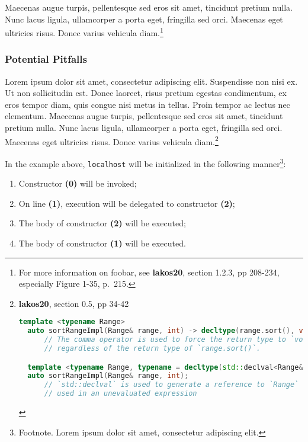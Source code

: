 \documentclass[twoside,10pt,letterpaper,usenames]{newstyle-PearsonGeneric-7-38}
\newcommand{\passthrough}[1]{\lstset{mathescape=false}#1\lstset{mathescape=true}}
\begin{document}
Maecenas augue turpis, pellentesque sed eros sit amet, tincidunt pretium
nulla. Nunc lacus ligula, ullamcorper a porta eget, fringilla sed orci.
Maecenas eget ultricies risus. Donec varius vehicula diam.\footnote{For
  more information on foobar, see \textbf{lakos20}, section 1.2.3, pp
  208-234, especially Figure 1-35, p.~215.}

\hypertarget{potential-pitfalls}{%
\subsubsection{Potential Pitfalls}\label{potential-pitfalls}}

Lorem ipsum dolor sit amet, consectetur adipiscing elit. Suspendisse non
nisi ex. Ut non sollicitudin est. Donec laoreet, risus pretium egestas
condimentum, ex eros tempor diam, quis congue nisi metus in tellus.
Proin tempor ac lectus nec elementum. Maecenas augue turpis,
pellentesque sed eros sit amet, tincidunt pretium nulla. Nunc lacus
ligula, ullamcorper a porta eget, fringilla sed orci. Maecenas eget
ultricies risus. Donec varius vehicula diam.\footnote{\textbf{lakos20},
  section 0.5, pp 34-42

  \begin{lstlisting}[language=C++, label={ testlabel }, basicstyle=\footnotesize]
  template <typename Range>
  auto sortRangeImpl(Range& range, int) -> decltype(range.sort(), void());
      // The comma operator is used to force the return type to `void`,
      // regardless of the return type of `range.sort()`.

  template <typename Range, typename = decltype(std::declval<Range&>().sort()>
  auto sortRangeImpl(Range& range, int);
      // `std::declval` is used to generate a reference to `Range` that can be
      // used in an unevaluated expression
  \end{lstlisting}
      }

In the example above, \passthrough{\lstinline!localhost!} will be
initialized in the following manner\footnote{Footnote. Lorem ipsum dolor
  sit amet, consectetur adipiscing elit.}:

\begin{enumerate}
\def\labelenumi{\arabic{enumi}.}
\item
  {Constructor} \textbf{(0)} will be invoked;
\item
  On line \textbf{(1)}, execution will be delegated to constructor
  \textbf{(2)};
\item
  The body of constructor \textbf{(2)} will be executed;
\item
  The body of constructor \textbf{(1)} will be executed.
\end{enumerate}
\end{document}
